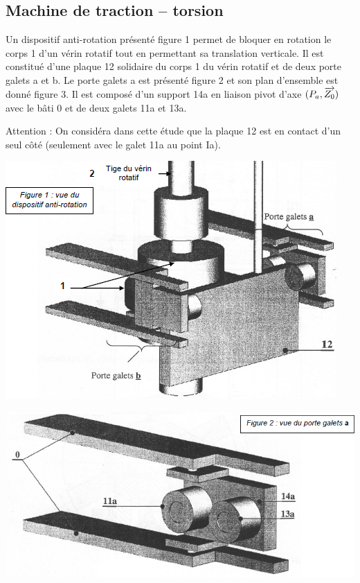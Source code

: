 \documentclass[10pt]{article}
\begin{document}
\subsection*{Machine de traction -- torsion}

\setcounter{subparagraph}{0}


Un dispositif anti-rotation présenté figure 1 permet de bloquer en rotation le corps 1 d'un vérin
rotatif tout en permettant sa translation verticale. Il est constitué d'une plaque 12 solidaire du corps 1 du vérin rotatif et de deux porte galets a et b. Le porte galets a est présenté figure 2 et son plan d'ensemble est donné figure 3. Il est composé d'un support 14a en liaison pivot d'axe $(P_a,\overrightarrow{Z_0})$ avec le bâti 0 et de deux galets 11a et 13a.

Attention : On considéra dans cette étude que la plaque 12 est en contact d'un seul côté (seulement avec le galet 11a au point Ia).


\begin{minipage}[c]{.48\linewidth}
\begin{center}
\includegraphics[width=.9\textwidth]{images/traction1}
\end{center}
\end{minipage}\hfill
\begin{minipage}[c]{.48\linewidth}
\begin{center}
\includegraphics[width=.8\textwidth]{images/traction2}
\end{center}
\end{minipage}\hfill
\end{document}
